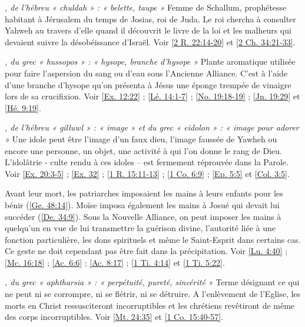 \begin{multicols}{2}
\textit{, de l'hébreu « chuldah » : « belette, taupe »}\newline
Femme de Schallum, prophétesse habitant à Jérusalem du temps de Josias, roi de Juda. Le roi chercha à consulter Yahweh au travers d'elle quand il découvrit le livre de la loi et les malheurs qui devaient suivre la désobéissance d'Israël. Voir \vref{2 R. 22:14-20} et \vref{2 Ch. 34:21-33}.

\textit{, du grec « hussopos » : « hysope, branche d'hysope »}\newline
Plante aromatique utilisée pour faire l'aspersion du sang ou d'eau sous l'Ancienne Alliance. C'est à l'aide d'une branche d'hysope qu'on présenta à Jésus une éponge trempée de vinaigre lors de sa crucifixion. Voir \vref{Ex. 12:22} ; \vref{Lé. 14:1-7} ; \vref{No. 19:18-19} ; \vref{Jn. 19:29} et \vref{Hé. 9:19}.

\textit{, de l'hébreu « gilluwl » : « image » et du grec « eidolon » : « image pour adorer »}\newline
Une idole peut être l'image d'un faux dieu, l'image faussée de Yawheh ou encore une personne, un objet, une activité à qui l'on donne le rang de Dieu. L'idolâtrie - culte rendu à ces idoles – est fermement réprouvée dans la Parole. Voir \vref{Ex. 20:3-5} ; \vref{Ex. 32} ; \vref{1 R. 15:11-13} ; \vref{1 Co. 6:9} ; \vref{Ep. 5:5} et \vref{Col. 3:5}.

\textit{}\newline
Avant leur mort, les patriarches imposaient les mains à leurs enfants pour les bénir (\vref{Ge. 48:14}). Moïse imposa également les mains à Josué qui devait lui succéder (\vref{De. 34:9}). Sous la Nouvelle Alliance, on peut imposer les mains à quelqu'un en vue de lui transmettre la guérison divine, l'autorité liée à une fonction particulière, les dons spirituels et même le Saint-Esprit dans certains cas. Ce geste ne doit cependant pas être fait dans la précipitation. Voir \vref{Lu. 4:40} ; \vref{Mc. 16:18} ; \vref{Ac. 6:6} ; \vref{Ac. 8:17} ; \vref{1 Ti. 4:14} et \vref{1 Ti. 5:22}.

\textit{, du grec « aphtharsia » : « perpétuité, pureté, sincérité »}\newline
Terme désignant ce qui ne peut ni se corrompre, ni se flétrir, ni se détruire. A l'enlèvement de l'Eglise, les morts en Christ ressusciteront incorruptibles et les chrétiens revêtiront de même des corps incorruptibles. Voir \vref{Mt. 24:35} et \vref{1 Co. 15:40-57}.


\end{multicols}
